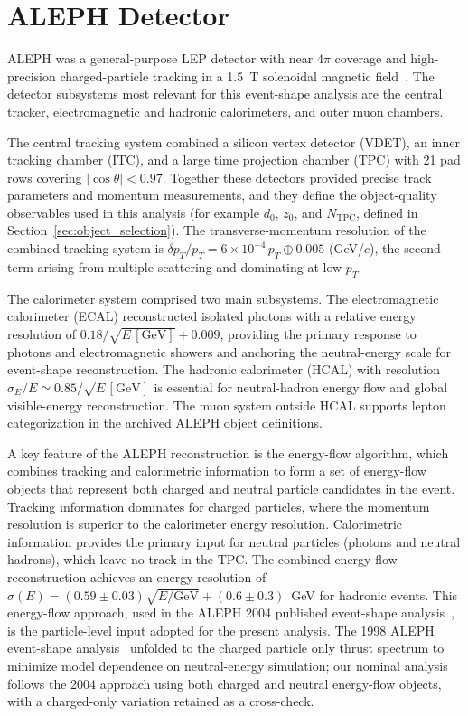 \section{ALEPH Detector}
\label{sec:aleph}

ALEPH was a general-purpose LEP detector with near $4\pi$ coverage and high-precision charged-particle tracking in a 1.5~T solenoidal magnetic field~\cite{Decamp:1990jra,ALEPH:1994ayc, Heister:2003aj}. The detector subsystems most relevant for this event-shape analysis are the central tracker, electromagnetic and hadronic calorimeters, and outer muon chambers.

The central tracking system combined a silicon vertex detector (VDET), an inner tracking chamber (ITC), and a large time projection chamber (TPC) with 21 pad rows covering $|\cos\theta|<0.97$. Together these detectors provided precise track parameters and momentum measurements, and they define the object-quality observables used in this analysis (for example $d_0$, $z_0$, and $N_{\mathrm{TPC}}$, defined in Section~\ref{sec:object_selection}). The transverse-momentum resolution of the combined tracking system is
$\delta p_T/p_T = 6\times10^{-4}\,p_T \oplus 0.005$ (GeV/$c$), the second term arising from
multiple scattering and dominating at low $p_T$.

The calorimeter system comprised two main subsystems. The electromagnetic calorimeter (ECAL) reconstructed isolated photons with a relative energy resolution of $0.18/\sqrt{E\,[\mathrm{GeV}]} + 0.009$, providing the primary response to photons and electromagnetic showers and anchoring the neutral-energy scale for event-shape reconstruction. The hadronic calorimeter (HCAL) with resolution $\sigma_E/E \simeq 0.85/\sqrt{E\,[\mathrm{GeV}]}$ is essential for neutral-hadron energy flow and global visible-energy reconstruction. The muon system outside HCAL supports lepton categorization in the archived ALEPH object definitions.

A key feature of the ALEPH reconstruction is the energy-flow algorithm, which combines tracking and calorimetric information to form a set of energy-flow objects that represent both charged and neutral particle candidates in the event. Tracking information dominates for charged particles, where the momentum resolution is superior to the calorimeter energy resolution. Calorimetric information provides the primary input for neutral particles (photons and neutral hadrons), which leave no track in the TPC. The combined energy-flow reconstruction achieves an energy resolution of $\sigma(E) = (0.59\pm0.03)\sqrt{E/\text{GeV}} + (0.6\pm0.3)$~GeV for hadronic events. This energy-flow approach, used in the ALEPH 2004 published event-shape analysis~\cite{Heister:2003aj}, is the particle-level input adopted for the present analysis. The 1998 ALEPH event-shape analysis~\cite{Barate:1996fi} unfolded to the charged particle only thrust spectrum to minimize model dependence on neutral-energy simulation; our nominal analysis follows the 2004 approach using both charged and neutral energy-flow objects, with a charged-only variation retained as a cross-check.